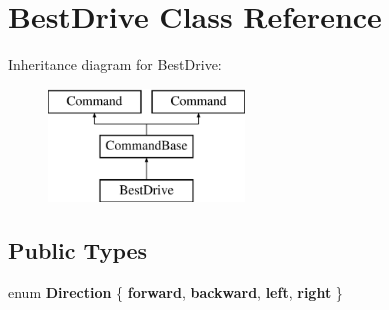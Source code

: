 \hypertarget{class_best_drive}{}\section{Best\+Drive Class Reference}
\label{class_best_drive}
Inheritance diagram for Best\+Drive\+:\begin{figure}[H]
\begin{center}
\leavevmode
\includegraphics[height=3.000000cm]{class_best_drive}
\end{center}
\end{figure}
\subsection*{Public Types}
\begin{DoxyCompactItemize}
\item 
\hypertarget{class_best_drive_a0649c88785769dedd5adbac478aa761a}{}enum {\bfseries Direction} \{ {\bfseries forward}, 
{\bfseries backward}, 
{\bfseries left}, 
{\bfseries right}
 \}\label{class_best_drive_a0649c88785769dedd5adbac478aa761a}

\end{DoxyCompactItemize}
